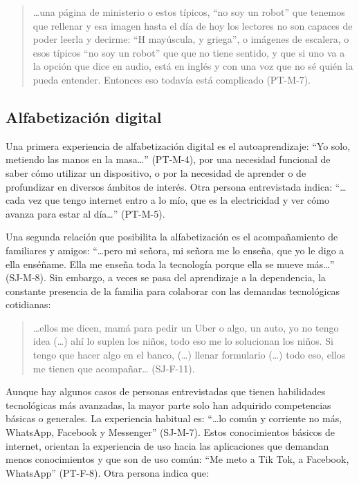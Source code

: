 		\begin{quote}
			\ldots una página de ministerio o estos típicos, \enquote{no soy un robot} que
			tenemos que rellenar y esa imagen hasta el día de hoy los lectores no
			son capaces de poder leerla y decirme: \enquote{H mayúscula, y griega}, o
			imágenes de escalera, o esos típicos \enquote{no soy un robot} que que no
			tiene sentido, y que si uno va a la opción que dice en audio, está en
			inglés y con una voz que no sé quién la pueda entender. Entonces eso
			todavía está complicado (PT-M-7).
		\end{quote}
		
\subsection{Alfabetización digital}\label{sub-sec-alfabetizacióndigital}

Una primera experiencia de alfabetización digital es el autoaprendizaje:
\enquote{Yo solo, metiendo las manos en la masa\ldots} (PT-M-4), por una
necesidad funcional de saber cómo utilizar un dispositivo, o por la
necesidad de aprender o de profundizar en diversos ámbitos de interés.
Otra persona entrevistada indica: \enquote{\ldots cada vez que tengo internet entro
	a lo mío, que es la electricidad y ver cómo avanza para estar al
	día\ldots} (PT-M-5).

Una segunda relación que posibilita la alfabetización es el
acompañamiento de familiares y amigos: \enquote{\ldots pero mi señora, mi señora me
	lo enseña, que yo le digo a ella enséñame. Ella me enseña toda la
	tecnología porque ella se mueve más\ldots} (SJ-M-8). Sin embargo, a
veces se pasa del aprendizaje a la dependencia, la constante presencia
de la familia para colaborar con las demandas tecnológicas cotidianas:

\begin{quote}
	\ldots ellos me dicen, mamá para pedir un Uber o algo, un auto, yo no tengo
	idea (\ldots) ahí lo suplen los niños, todo eso me lo solucionan los niños.
	Si tengo que hacer algo en el banco, (\ldots) llenar formulario (\ldots)
	todo eso, ellos me tienen que acompañar\ldots{} (SJ-F-11).
\end{quote}

Aunque hay algunos casos de personas entrevistadas que tienen
habilidades tecnológicas más avanzadas, la mayor parte solo han
adquirido competencias básicas o generales. La experiencia habitual es:
\enquote{\ldots lo común y corriente no más, WhatsApp, Facebook y Messenger}
(SJ-M-7). Estos conocimientos básicos de internet, orientan la
experiencia de uso hacia las aplicaciones que demandan menos
conocimientos y que son de uso común: \enquote{Me meto a Tik Tok, a Facebook,
	WhatsApp} (PT-F-8). Otra persona indica que:

